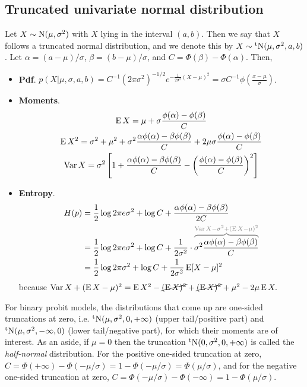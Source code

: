 \subsection{Truncated univariate normal distribution}

Let $X \sim \operatorname{N}(\mu,\sigma^2)$ with $X$ lying in the interval $(a,b)$.
Then we say that $X$ follows a truncated normal distribution, and we denote this by $X\sim\operatorname{{}^tN}(\mu,\sigma^2,a,b)$.
Let $\alpha = (a-\mu)/\sigma$, $\beta = (b-\mu)/\sigma$, and $C = \Phi(\beta) - \Phi(\alpha)$.
Then,
\begin{itemize}
  \item \textbf{Pdf}. $p(X|\mu,\sigma,a,b) = C^{-1} (2\pi\sigma^2)^{-1/2}e^{-\frac{1}{2\sigma^2} (X-\mu)^2} = \sigma C^{-1} \phi(\frac{x-\mu}{\sigma})$.
  \item \textbf{Moments}. 
  \vspace{-1.2em}
  \begin{gather*}
    \operatorname{E} X = \mu + \sigma \frac{\phi(\alpha) - \phi(\beta)}{C} \\
    \operatorname{E} X^2 = \sigma^2 + \mu^2 + \sigma^2  \frac{\alpha\phi(\alpha) - \beta\phi(\beta)}{C}   + 2\mu\sigma \frac{\phi(\alpha) - \phi(\beta)}{C} \\
    \operatorname{Var} X = \sigma^2 \left[ 1 +  \frac{\alpha\phi(\alpha) - \beta\phi(\beta)}{C} - \left(\frac{\phi(\alpha) - \phi(\beta)}{C}\right)^2 \right]
  \end{gather*}
  \item \textbf{Entropy}.
  \begin{align*}
    H(p) 
    &= \half\log 2\pi e\sigma^2 + \log C + \frac{\alpha\phi(\alpha) - \beta\phi(\beta)}{2C} \\
    &= \half\log 2\pi e\sigma^2 + \log C + \frac{1}{2\sigma^2}\cdot \greyoverbrace{\sigma^2\frac{\alpha\phi(\alpha) - \beta\phi(\beta)}{C}}{\Var X -\sigma^2 + (\E X - \mu)^2} \\
    &= \half\log 2\pi \sigma^2 + \log C + \frac{1}{2\sigma^2}\E [X - \mu]^2 
  \end{align*}
  because $\operatorname{Var} X + (\operatorname{E} X - \mu)^2 = \operatorname{E} X^2 - \cancel{(\operatorname{E} X)^2} + \cancel{(\operatorname{E} X)^2} + \mu^2 - 2\mu\operatorname{E} X.$
\end{itemize}

For binary probit models, the distributions that come up are one-sided truncations at zero, i.e. $\operatorname{{}^tN}(\mu,\sigma^2,0,+\infty)$ (upper tail/positive part) and $\operatorname{{}^tN}(\mu,\sigma^2,-\infty,0)$ (lower tail/negative part), for which their moments are of interest.
As an aside, if $\mu = 0$ then the truncation $\operatorname{{}^tN}(0,\sigma^2,0,+\infty)$ is called the \emph{half-normal} distribution.
For the positive one-sided truncation at zero, $C = \Phi(+\infty) - \Phi(-\mu/\sigma) = 1 - \Phi(-\mu/\sigma) = \Phi(\mu/\sigma)$, and for the negative one-sided truncation at zero, $C = \Phi(-\mu/\sigma) - \Phi(-\infty) = 1 - \Phi(\mu/\sigma)$.

